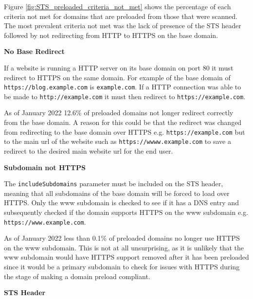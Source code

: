 \documentclass{mscreport}
\begin{document}
\vspace{0.3cm} \noindent
Figure \ref{fig:STS_preloaded_criteria_not_met} shows the percentage of each criteria not met for domains that are preloaded from those that were scanned. The most prevalent criteria not met  was the lack of presence of the STS header followed by not redirecting from HTTP to HTTPS on the base domain.

\vspace{0.5cm} \noindent
\textbf{No Base Redirect}

\vspace{0.3cm} \noindent
If a website is running a HTTP server on its base domain on port 80 it must redirect to HTTPS on the same domain. For example of the base domain of \texttt{https://blog.example.com} is \texttt{example.com}. If a HTTP connection was able to be made to \texttt{http://example.com} it must then redirect to \texttt{https://example.com}.

\vspace{0.3cm} \noindent
As of January 2022 12.6\% of preloaded domains not longer redirect correctly from the base domain. A reason for this could be that the redirect was changed from redirecting to the base domain over HTTPS e.g. \texttt{https://example.com} but to the main url of the website such as \texttt{https://wwww.example.com} to save a redirect to the desired main website url for the end user.

\vspace{0.5cm} \noindent
\textbf{Subdomain not HTTPS}

\vspace{0.3cm} \noindent
The \texttt{includeSubdomains} parameter must be included on the STS header, meaning that all subdomains of the base domain will be forced to load over HTTPS. Only the www subdomain is checked to see if it has a DNS entry and subsequently checked if the domain supports HTTPS on the www subdomain e.g. \texttt{https://www.example.com}.

\vspace{0.3cm} \noindent
As of January 2022 less than 0.1\% of preloaded domains no longer use HTTPS on the www subdomain. This is not at all unsurprising, as it is unlikely that the www subdomain would have HTTPS support removed after it has been preloaded since it would be a primary subdomain to check for issues with HTTPS during the stage of making a domain preload compliant.

\vspace{0.5cm} \noindent
\textbf{STS Header}
\end{document}
